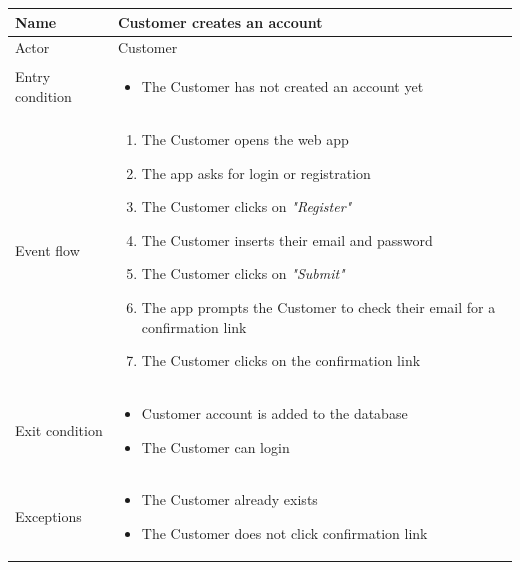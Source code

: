 \begin{table}[H]
    \begin{tabu} to \textwidth {|X|X[4]|}
        \hline
        Name            & Customer creates an account \\ \hline
        Actor           & Customer                    \\ \hline
        Entry condition & \begin{itemize}
            \item The Customer has not created an account yet
        \end{itemize}  \\ \hline
        Event flow      & \begin{enumerate}
            \item The Customer opens the web app
            \item The app asks for login or registration
            \item The Customer clicks on \emph{"Register"}
            \item The Customer inserts their email and password
            \item The Customer clicks on \emph{"Submit"}
            \item The app prompts the Customer to check their email for a confirmation link
            \item The Customer clicks on the confirmation link
        \end{enumerate}  \\ \hline
        Exit condition  & \begin{itemize}
            \item Customer account is added to the database
            \item The Customer can login
        \end{itemize}  \\ \hline
        Exceptions      & \begin{itemize}
            \item The Customer already exists
            \item The Customer does not click confirmation link
        \end{itemize}  \\ \hline
    \end{tabu}
\end{table}

